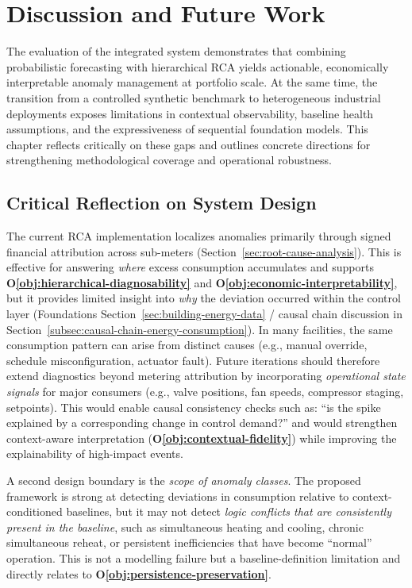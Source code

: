 \chapter{Discussion and Future Work}
\label{chap:discussion-future}

The evaluation of the integrated system demonstrates that combining probabilistic
forecasting with hierarchical \ac{RCA} yields actionable, economically interpretable
anomaly management at portfolio scale. At the same time, the transition from a
controlled synthetic benchmark to heterogeneous industrial deployments exposes
limitations in contextual observability, baseline health assumptions, and the
expressiveness of sequential foundation models. This chapter reflects critically on
these gaps and outlines concrete directions for strengthening methodological coverage
and operational robustness.

\section{Critical Reflection on System Design}

The current \ac{RCA} implementation localizes anomalies primarily through signed
financial attribution across sub-meters (Section~\ref{sec:root-cause-analysis}).
This is effective for answering \emph{where} excess consumption accumulates and
supports \textbf{O\ref{obj:hierarchical-diagnosability}} and
\textbf{O\ref{obj:economic-interpretability}}, but it provides limited insight into
\emph{why} the deviation occurred within the control layer
(Foundations Section~\ref{sec:building-energy-data} / causal chain discussion in
Section~\ref{subsec:causal-chain-energy-consumption}). In many facilities, the same consumption pattern can arise
from distinct causes (e.g., manual override, schedule misconfiguration, actuator
fault). Future iterations should therefore extend diagnostics beyond metering
attribution by incorporating \emph{operational state signals} for major consumers
(e.g., valve positions, fan speeds, compressor staging, setpoints). This would enable
causal consistency checks such as: ``is the spike explained by a corresponding change
in control demand?'' and would strengthen context-aware interpretation
(\textbf{O\ref{obj:contextual-fidelity}}) while improving the explainability of
high-impact events.

A second design boundary is the \emph{scope of anomaly classes}. The proposed framework
is strong at detecting deviations in consumption relative to context-conditioned
baselines, but it may not
detect \emph{logic conflicts that are consistently present in the baseline}, such as
simultaneous heating and cooling, chronic simultaneous reheat, or persistent
inefficiencies that have become ``normal'' operation. This is not a modelling failure
but a baseline-definition limitation and directly relates to
\textbf{O\ref{obj:persistence-preservation}}.

